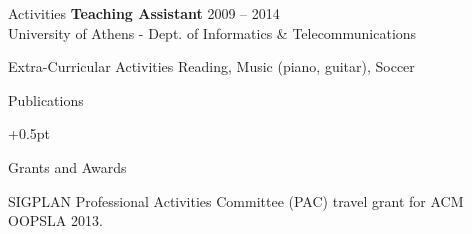 \documentclass{resume}
\begin{document}

\begin{rSection}{Activities}
  {\bf Teaching Assistant} \hfill {2009 -- 2014} \\
  University of Athens - Dept. of Informatics \& Telecommunications \\
\end{rSection}

\begin{rSection}{Extra-Curricular Activities}
  Reading, Music (piano, guitar), Soccer \\
\end{rSection}



\begin{rSection}{Publications}
  \begin{rSubsection}{}{}{}{}
    \itemsep +0.5pt %
  \item {}
  \item {}
  \end{rSubsection}
\end{rSection}

\begin{rSection}{Grants and Awards}
  \begin{rSubsection}{}{}{}{}
  \item SIGPLAN Professional Activities Committee (PAC) travel grant
    for ACM OOPSLA 2013.
  \end{rSubsection}
\end{rSection}
\end{document}
